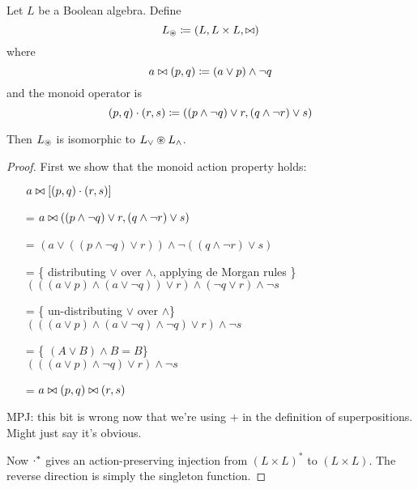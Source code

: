 \begin{prop}
  Let $L$ be a Boolean algebra. Define
  $$L_\circledast \coloneqq (L,L \times L,\bowtie)$$
  where
  $$a \bowtie (p, q) \coloneqq (a \vee p) \wedge \neg q$$
  and the monoid operator is
  $$(p, q) \cdot (r, s) \coloneqq ((p \wedge \neg q) \vee r, (q \wedge \neg r) \vee s)$$

  Then $L_\circledast$ is isomorphic to $L_\vee \circledast L_\wedge$.
\end{prop}
\begin{proof}
  First we show that the monoid action property holds:
  \begin{itemize}
    \item[ ]$a \bowtie \left[(p, q) \cdot (r, s)\right]$
    \item[=]$a \bowtie ((p \wedge \neg q) \vee r, (q \wedge \neg r) \vee s)$
    \item[=]$
      \left(
        a \vee
        \left(
          \left(
            p \wedge \neg q
          \right)
          \vee r
        \right)
      \right)
      \wedge \neg
      \left(
        \left(
          q \wedge \neg r
        \right)
        \vee s
      \right)$
    \item[=]\{ distributing $\vee$ over $\wedge$, applying de Morgan rules \}\\
      $
      \left(
        \left(
          \left(  
            a \vee p
          \right)
          \wedge
          \left(
            a \vee \neg q
          \right)
        \right)
        \vee r
      \right)
      \wedge 
      \left(
        \neg q \vee r
      \right)
      \wedge
      \neg s
      $
    \item[=]\{ un-distributing $\vee$ over $\wedge $\}\\
      $
      \left(
        \left(
          \left(  
            a \vee p
          \right)
          \wedge
          \left(
            a \vee \neg q
          \right)
          \wedge
          \neg q
        \right)
        \vee r
      \right)
      \wedge
      \neg s
      $
    \item[=]\{ $(A \vee B) \wedge B = B$\}\\
      $
      \left(
        \left(
          \left(  
            a \vee p
          \right)
          \wedge
          \neg q
        \right)
        \vee r
      \right)
      \wedge
      \neg s
      $
    \item[=]$a \bowtie (p, q) \bowtie (r, s)$
  \end{itemize}


  MPJ: this bit is wrong now that we're using $+$ in the definition of
  superpositions. Might just say it's obvious.
  
  Now $\cdot^\ast$ gives an action-preserving injection from $(L \times
  L)^\ast$ to $(L \times L)$. The reverse direction is simply the singleton function.
\end{proof}

